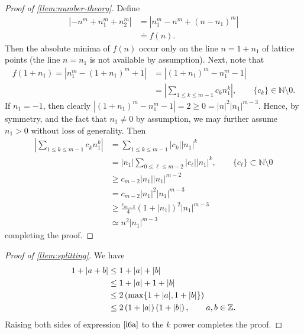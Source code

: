 %
%
\begin{proof}[Proof of \cref{llem:number-theory}] Define
%
\begin{equation*}
	\begin{split}
		| - n^{m} + n_1^{m} + n_2^{m }|
		& = | n_{1}^{m} - n^{m} + (n-n_{1})^{m}| 
		\\
		& \doteq f(n).
	\end{split}
\end{equation*}
%
%
Then the absolute minima
of $f(n)$ occur only on the line $n = 1+n_{1}$ of lattice points 
(the line $n = n_1$ is not available by assumption). Next, note that
%
%
\begin{equation*}
	\begin{split}
		f(1+ n_{1}) = | n_{1}^{m} - (1 + n_{1})^m + 1 |
		& = | (1 + n_{1} )^{m} - n_{1}^{m} -1 |
		\\
		& = | \sum_{1 \le k \le m-1} c_{k} n_1^{k}|, \qquad \{c_k\} \in \mathbb{N}
		\setminus 0.
	\end{split}
\end{equation*}
If $n_1 = -1$, then clearly $| (1 + n_{1})^m - n_1^m -1 | = 2 \ge 0 = |n|^2
|n_1|^{m-3}$. Hence, by symmetry, and the fact that $n_1 \neq 0$ by assumption,
we may further assume
$n_1 >0$ without loss of generality.
Then 
%
%
\begin{equation*}
	\begin{split}
	  | \sum_{1 \le k \le m-1} c_{k} n_1^{k}|
	 & = \sum_{1 \le k \le m-1} |c_{k}| |n_1|^{k}
	 \\
	 & = |n_1| \sum_{0 \le \ell \le m-2} |c_{\ell}| |n_1|^{k}, \qquad \{c_\ell\}
	 \subset \mathbb{N} \setminus 0
	 \\
	 & \ge c_{m-2}|n_1| | n_1|^{m-2}
	 \\
	 & = c_{m-2}| n_1 |^2 | n_1 |^{m-3}
	 \\
	 & \ge \frac{c_{m-2}}{4} (1 + | n_1 |)^2 | n_1|^{m-3}
	 \\
	 & \simeq n^2 | n_1 |^{m-3}
	\end{split}
\end{equation*}
%
%
completing the proof. 
\end{proof}
%
%
%
\begin{proof}[Proof of \cref{llem:splitting}] We have
%
%
\begin{equation}
	\label{l6a}
	\begin{split}
		1 + | a + b | 
		& \le 1 + | a | + | b | 
		\\
		& \le 1 + | a | + 1 + | b | 
		\\
		& \le 2\left( \max\{1+| a |, 1+| b | \}\right)
		\\
		& \le 2 \left( 1 + | a | \right)\left( 1 + | b | \right), \qquad a, b \in {\mathbb{Z}}.
	\end{split}
\end{equation}
%
%
Raising both sides of expression $\eqref{l6a}$ to the $k$ power completes 
the proof. 
\end{proof}
